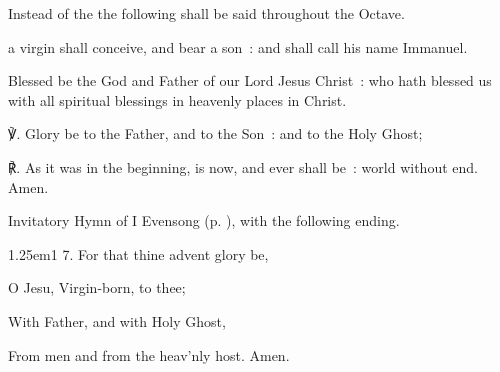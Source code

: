 \mattins\label{ChristmasMattins}

\vspace{-1\baselineskip}

\label{eccevirgo}
{\begin{rubric}
    Instead of the  the following shall be said throughout the Octave.
\end{rubric}}

 a virgin shall conceive, and bear a son~: and shall call his name Immanuel.
    


Blessed be the God and Father of our Lord Jesus Christ~: who hath blessed us with all spiritual blessings in heavenly places in Christ.

℣. Glory be to the Father, and to the Son~: and to the Holy Ghost;\par
℟. As it was in the beginning, is now, and ever shall be~: world without end. Amen.\\



\mattinsInvitatoryHymn\label{ChristmasInvitatoryHymn}

\begin{rubric}
	Invitatory Hymn of I Evensong (p. \pageref{ChristmasEvensongHymn}), with the following ending.
\end{rubric}

\begin{hangparas}{1.25em}{1}
7. For that thine advent glory be,

O Jesu, Virgin-born, to thee;

With Father, and with Holy Ghost,

From men and from the heav'nly host. Amen.
\end{hangparas}

\mattinsOfficeHymn\label{ChristmasMattinsHymn}

